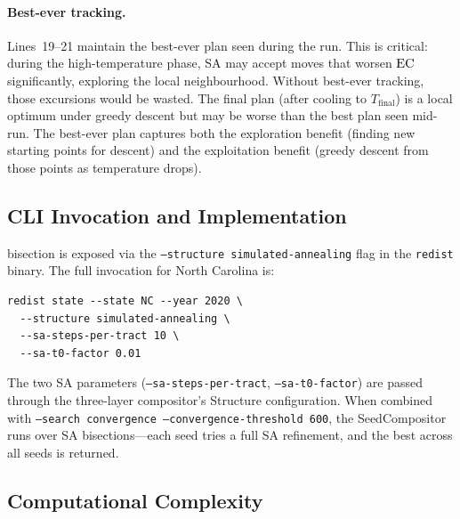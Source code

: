 \paragraph{Best-ever tracking.}
Lines~19--21 maintain the best-ever plan seen during the run.
This is critical: during the high-temperature phase, SA may accept moves
that worsen $\mathrm{EC}$ significantly, exploring the local neighbourhood.
Without best-ever tracking, those excursions would be wasted.
The final plan (after cooling to $T_{\mathrm{final}}$) is a local optimum
under greedy descent but may be worse than the best plan seen mid-run.
The best-ever plan captures both the exploration benefit (finding new
starting points for descent) and the exploitation benefit (greedy descent
from those points as temperature drops).

\subsection{CLI Invocation and Implementation}

\sa{} bisection is exposed via the \texttt{--structure simulated-annealing}
flag in the \texttt{redist} binary.
The full invocation for North Carolina is:

\begin{verbatim}
redist state --state NC --year 2020 \
  --structure simulated-annealing \
  --sa-steps-per-tract 10 \
  --sa-t0-factor 0.01
\end{verbatim}

The two SA parameters (\texttt{--sa-steps-per-tract}, \texttt{--sa-t0-factor})
are passed through the three-layer compositor's Structure configuration.
When combined with \texttt{--search convergence --convergence-threshold 600},
the SeedCompositor runs \cs{} over SA bisections---each seed tries a full
SA refinement, and the best across all seeds is returned.

\subsection{Computational Complexity}

